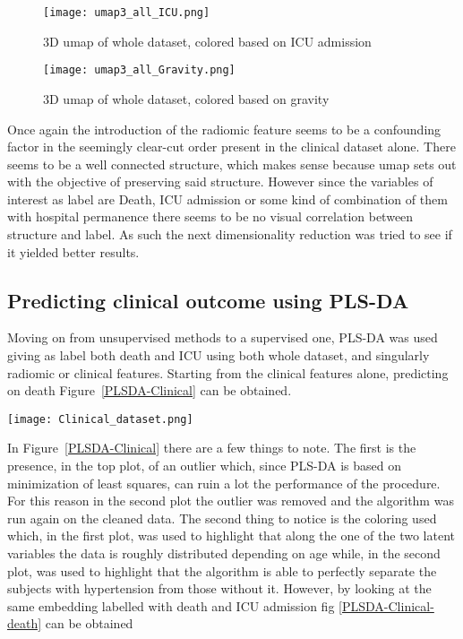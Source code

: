 \begin{figure}[htbp]
  		\texttt{[image: umap3\_all\_ICU.png]}\label{umap3_all_ICU}
          \caption{3D umap of whole dataset, colored based on ICU admission}
\end{figure}

\begin{figure}[htbp]
  		\texttt{[image: umap3\_all\_Gravity.png]}\label{umap3_all_Gravity}
          \caption{3D umap of whole dataset, colored based on gravity}
\end{figure}

Once again the introduction of the radiomic feature seems to be a confounding factor in the seemingly clear-cut order present in the clinical dataset alone.
There seems to be a well connected structure, which makes sense because umap sets out with the objective of preserving said structure.
However since the variables of interest as label are Death, ICU admission or some kind of combination of them with hospital permanence there seems to be no visual correlation between structure and label.
As such the next dimensionality reduction was tried to see if it yielded better results.
 
\subsection{Predicting clinical outcome using PLS-DA}
Moving on from unsupervised methods to a supervised one, PLS-DA was used giving as label both death and ICU using both whole dataset, and singularly radiomic or clinical features. 
Starting from the clinical features alone, predicting on death Figure~\ref{PLSDA-Clinical} can be obtained.

\begin{figure*}[htbp]
  		\texttt{[image: Clinical\_dataset.png]}
          \caption{PLS-DA predicting on death coloured with age and hypertension\label{PLSDA-Clinical}}
\end{figure*}

In Figure~\ref{PLSDA-Clinical} there are a few things to note. 
The first is the presence, in the top plot, of an outlier which, since PLS-DA is based on minimization of least squares, can ruin a lot the performance of the procedure. 
For this reason in the second plot the outlier was removed and the algorithm was run again on the cleaned data.
The second thing to notice is the coloring used which, in the first plot, was used to highlight that along the one of the two latent variables the data is roughly distributed depending on age while, in the second plot, was used to highlight that the algorithm is able to perfectly separate the subjects with hypertension from those without it.
However, by looking at the same embedding labelled with death and ICU admission fig \ref{PLSDA-Clinical-death} can be obtained

